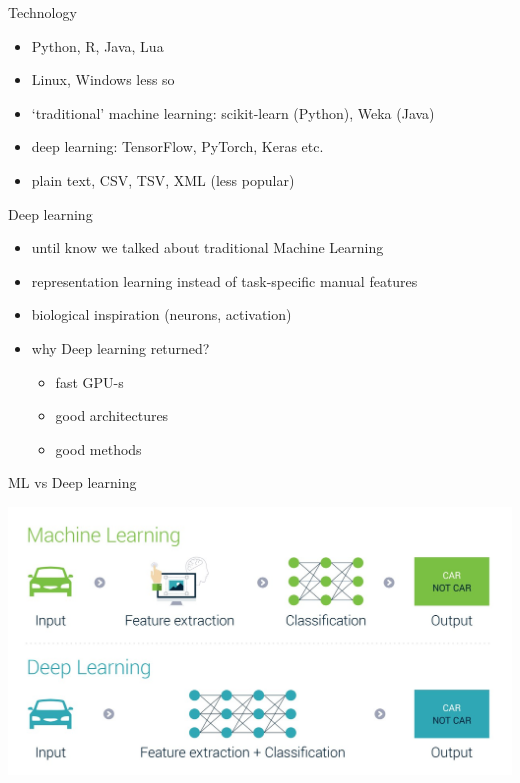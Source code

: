 \documentclass[bigger]{beamer}
\begin{document}
\begin{frame}{Technology}
    \begin{itemize}
        \item Python, R, Java, Lua
        \item Linux, Windows less so
        \item `traditional' machine learning: scikit-learn (Python), Weka (Java)
        \item deep learning: TensorFlow, PyTorch, Keras etc.
        \item plain text, CSV, TSV, XML (less popular)
    \end{itemize}
\end{frame}

\begin{frame}{Deep learning}
    \begin{itemize}
    	\item until know we talked about traditional Machine Learning
        \item representation learning instead of task-specific manual features
        \item biological inspiration (neurons, activation)
        \item why Deep learning returned?
        \begin{itemize}
        	\item fast GPU-s
        	\item good architectures
        	\item good methods
        \end{itemize}
    \end{itemize}
\end{frame}

\begin{frame}{ML vs Deep learning}
	
	\centering
	\includegraphics[width=.8\textwidth]{fig/ml}
\end{frame}
\end{document}
